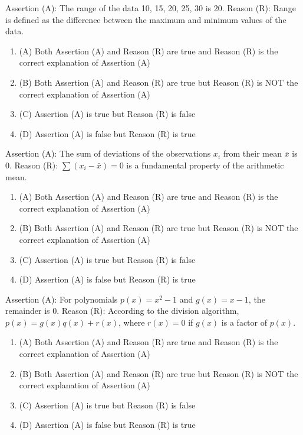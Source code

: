 \documentclass[12pt,a4paper]{exam}
\begin{document}
\begin{questions}
\question[1] Assertion (A): The range of the data 10, 15, 20, 25, 30 is 20. Reason (R): Range is defined as the difference between the maximum and minimum values of the data.
\begin{enumerate}[label=(\Alph*)]
  \item (A) Both Assertion (A) and Reason (R) are true and Reason (R) is the correct explanation of Assertion (A)
  \item (B) Both Assertion (A) and Reason (R) are true but Reason (R) is NOT the correct explanation of Assertion (A)
  \item (C) Assertion (A) is true but Reason (R) is false
  \item (D) Assertion (A) is false but Reason (R) is true
\end{enumerate}
\vspace{0.15cm}

\question[1] Assertion (A): The sum of deviations of the observations $x_i$ from their mean $\bar{x}$ is 0. Reason (R): $\sum (x_i - \bar{x}) = 0$ is a fundamental property of the arithmetic mean.
\begin{enumerate}[label=(\Alph*)]
  \item (A) Both Assertion (A) and Reason (R) are true and Reason (R) is the correct explanation of Assertion (A)
  \item (B) Both Assertion (A) and Reason (R) are true but Reason (R) is NOT the correct explanation of Assertion (A)
  \item (C) Assertion (A) is true but Reason (R) is false
  \item (D) Assertion (A) is false but Reason (R) is true
\end{enumerate}
\vspace{0.15cm}

\question[1] Assertion (A): For polynomials $p(x) = x^2 - 1$ and $g(x) = x - 1$, the remainder is 0. Reason (R): According to the division algorithm, $p(x) = g(x)q(x) + r(x)$, where $r(x) = 0$ if $g(x)$ is a factor of $p(x)$.
\begin{enumerate}[label=(\Alph*)]
  \item (A) Both Assertion (A) and Reason (R) are true and Reason (R) is the correct explanation of Assertion (A)
  \item (B) Both Assertion (A) and Reason (R) are true but Reason (R) is NOT the correct explanation of Assertion (A)
  \item (C) Assertion (A) is true but Reason (R) is false
  \item (D) Assertion (A) is false but Reason (R) is true
\end{enumerate}
\vspace{0.15cm}


\end{questions}
\end{document}
